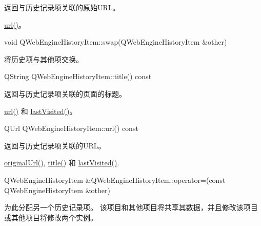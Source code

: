 返回与历史记录项关联的原始URL。

\begin{seeAlso}
\href{https://github.com/QtDocumentCN/QtDocumentCN/blob/master/Src/W/QWebEngineHistoryItem/qwebenginehistoryitem.html#url}{url()}。
\end{seeAlso}

void QWebEngineHistoryItem::swap(QWebEngineHistoryItem \&other)

将历史项与其他项交换。

QString QWebEngineHistoryItem::title() const

返回与历史记录项关联的页面的标题。

\begin{seeAlso}
\href{https://github.com/QtDocumentCN/QtDocumentCN/blob/master/Src/W/QWebEngineHistoryItem/qwebenginehistoryitem.html#url}{url()} 和 \href{https://github.com/QtDocumentCN/QtDocumentCN/blob/master/Src/W/QWebEngineHistoryItem/qwebenginehistoryitem.html#lastVisited}{lastVisited()}。
\end{seeAlso}

QUrl QWebEngineHistoryItem::url() const

返回与历史记录项关联的URL。

\begin{seeAlso}
\href{https://github.com/QtDocumentCN/QtDocumentCN/blob/master/Src/W/QWebEngineHistoryItem/qwebenginehistoryitem.html#originalUrl}{originalUrl()}, \href{https://github.com/QtDocumentCN/QtDocumentCN/blob/master/Src/W/QWebEngineHistoryItem/qwebenginehistoryitem.html#title}{title()} 和 \href{https://github.com/QtDocumentCN/QtDocumentCN/blob/master/Src/W/QWebEngineHistoryItem/qwebenginehistoryitem.html#lastVisited}{lastVisited()}.
\end{seeAlso}

	
QWebEngineHistoryItem \&QWebEngineHistoryItem::operator=(const QWebEngineHistoryItem \&other)


为此分配另一个历史记录项。 该项目和其他项目将共享其数据，并且修改该项目或其他项目将修改两个实例。

